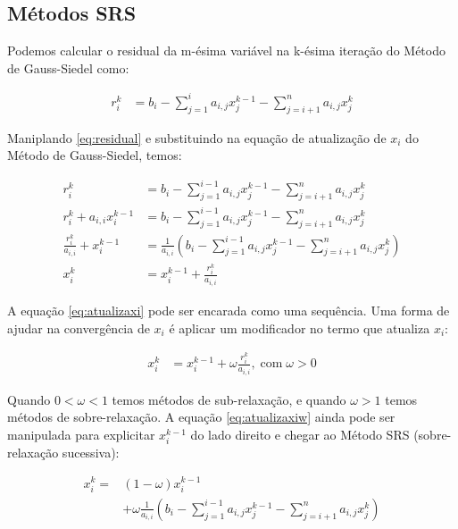 \documentclass[final,5p]{elsarticle}
\numberwithin{equation}{section}
\begin{document}
    \subsection{Métodos SRS}

        Podemos calcular o residual da m-ésima variável na k-ésima iteração do Método de Gauss-Siedel como:

        \begin{align}
            r_i^k &= b_i - \sum^{i}_{j=1} a_{i,j} x_j^{k-1} - \sum^{n}_{j=i+1} a_{i,j} x_j^{k} \label{eq:residual}
        \end{align}

        Maniplando \ref{eq:residual} e substituindo na equação de atualização de $x_i$ do Método de Gauss-Siedel, temos:

        \begin{align}
            r_i^k &= b_i - \sum^{i-1}_{j=1} a_{i,j} x_j^{k-1} - \sum^{n}_{j=i+1} a_{i,j} x_j^{k} \nonumber \\
            r_i^k + a_{i,i} x_i^{k-1} &= b_i - \sum^{i-1}_{j=1} a_{i,j} x_j^{k-1} - \sum^{n}_{j=i+1} a_{i,j} x_j^{k} \nonumber \\
            \frac{r_i^k}{a_{i,i}} + x_i^{k-1} &= \frac{1}{a_{i,i}} ( b_i - \sum^{i-1}_{j=1} a_{i,j} x_j^{k-1} - \sum^{n}_{j=i+1} a_{i,j} x_j^{k}) \nonumber \\
            x_i^k &= x_i^{k-1} + \frac{r_i^k}{a_{i,i}} \label{eq:atualizaxi}
        \end{align}

        A equação \ref{eq:atualizaxi} pode ser encarada como uma sequência. Uma forma de ajudar na convergência de ${x_i}$ é aplicar um modificador no termo que atualiza $x_i$:

        \begin{align}
            x_i^k &= x_i^{k-1} + \omega \frac{r_i^k}{a_{i,i}}, \;\text{com} \; \omega > 0 \label{eq:atualizaxiw}
        \end{align}

        Quando $0 < \omega < 1$ temos métodos de sub-relaxação, e quando $\omega > 1$ temos métodos de sobre-relaxação. A equação \ref{eq:atualizaxiw} ainda pode ser manipulada para explicitar $x_i^{k-1}$ do lado direito e chegar ao Método SRS (sobre-relaxação sucessiva):

        \begin{align}
            x_i^k = &(1 - \omega) x_i^{k-1} \nonumber \\
            &+ \omega \frac{1}{a_{i,i}} \left( b_i - \sum^{i-1}_{j=1} a_{i,j} x_j^{k-1} - \sum^{n}_{j=i+1} a_{i,j} x_j^{k} \right) \label{eq:atualizaxisrs}
        \end{align}
\end{document}
